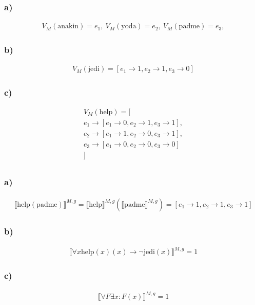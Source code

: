 \documentclass{article}
\renewcommand\t[1]{\text{#1}}
\begin{document}
\subsubsection*{a)}

\begin{gather*}
V_M(\t{anakin}) = e_1,\ 
V_M(\t{yoda}) = e_2,\ 
V_M(\t{padme}) = e_3, 
\end{gather*}


\subsubsection*{b)}

\begin{gather*}
V_M(\t{jedi}) = [e_1 \rightarrow 1, e_2 \rightarrow 1, e_3 \rightarrow 0]
\end{gather*}


\subsubsection*{c)}

\begin{gather*}
V_M(\t{help}) = [\\
e_1 \rightarrow [e_1 \rightarrow 0, e_2 \rightarrow 1, e_3 \rightarrow 1],\\
e_2 \rightarrow [e_1 \rightarrow 1, e_2 \rightarrow 0, e_3 \rightarrow 1],\\
e_3 \rightarrow [e_1 \rightarrow 0, e_2 \rightarrow 0, e_3 \rightarrow 0]\\
]
\end{gather*}

\subsection{}

\subsubsection*{a)}

\begin{gather*}
\llbracket\t{help}(\t{padme})\rrbracket^{M,g} = \llbracket\t{help}\rrbracket^{M,g}(\llbracket\t{padme}\rrbracket^{M,g}) =
[e_1 \rightarrow 1, e_2 \rightarrow 1, e_3 \rightarrow 1]
\end{gather*}

\subsubsection*{b)}

\begin{gather*}
\llbracket\forall x \t{help}(x)(x) \rightarrow \neg \t{jedi}(x)\rrbracket^{M,g} = 1
\end{gather*}

\subsubsection*{c)}

\begin{gather*}
\llbracket\forall F \exists x: F(x)\rrbracket^{M,g} = 1
\end{gather*}
\end{document}
